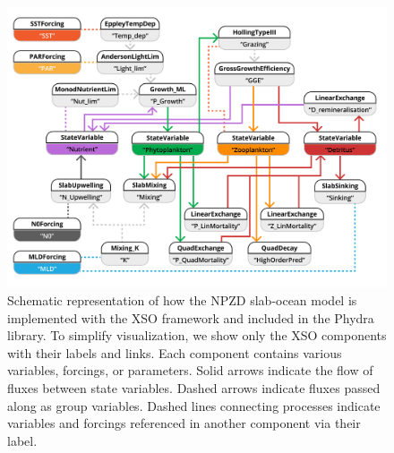 \documentclass[journal abbreviation, manuscript]{copernicus}
\begin{document}
\begin{figure}[t]
\includegraphics[width=15cm]{Figures/firstdraft_schematics/code_schematics/EMPOWER.pdf}
\caption{Schematic representation of how the NPZD slab-ocean model is implemented with the XSO framework and included in the Phydra library. To simplify visualization, we show only the XSO components with their labels and links. Each component contains various variables, forcings, or parameters. Solid arrows indicate the flow of fluxes between state variables. Dashed arrows indicate fluxes passed along as group variables. Dashed lines connecting processes indicate variables and forcings referenced in another component via their label.}
\label{Figure:CodeSchematics_2}
\end{figure}
\end{document}
